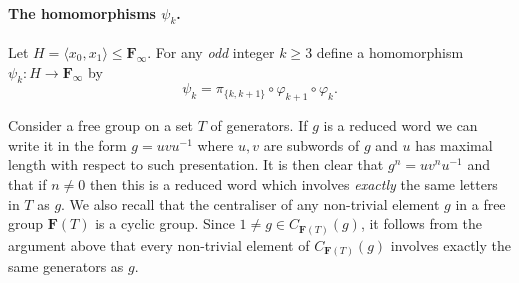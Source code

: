 \documentclass[12pt,reqno,a4paper]{article}
\theoremstyle{definition}
\theoremstyle{remark}
\numberwithin{equation}{section}
\numberwithin{figure}{section}
\newcommand{\B}[1]{{\mathbf #1}}
\begin{document}
\paragraph{The homomorphisms $\psi_k$.}
Let $H=\langle x_0,x_1\rangle\leq \B F_{\infty}$. 
For any {\em odd} integer $k \geq 3$ define a homomorphism $\psi_k\colon H\to \B F_{\infty}$ by
$$
\psi_k = \pi_{\{k,k+1\}}\circ \varphi_{k+1}\circ\varphi_{k}.
$$


Consider a free group on a set $T$ of generators.
If $g$ is a reduced word we can write it in the form $g=uvu^{-1}$ where $u,v$ are subwords of $g$ and $u$ has maximal length with respect to such presentation.
It is then clear that $g^n =uv^nu^{-1}$ and that if $n \neq 0$ then this is a reduced word which involves {\em exactly} the same letters in $T$ as $g$.
We also recall that the centraliser of any non-trivial element $g$ in a free group $\B F(T)$ is a cyclic group.
Since $1 \neq g \in C_{\B F(T)}(g)$, it follows from the argument above that every non-trivial element of $C_{\B F(T)}(g)$ involves exactly the same generators as $g$.
\end{document}
